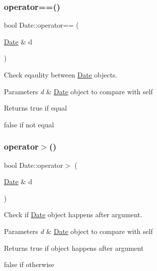 \subsubsection{\texorpdfstring{operator==()}{operator==()}}
{\footnotesize\ttfamily bool Date\+::operator== (\begin{DoxyParamCaption}\item[{\mbox{\hyperlink{classDate}{Date}} \&}]{d }\end{DoxyParamCaption})}



Check eqaulity between \mbox{\hyperlink{classDate}{Date}} objects. 


\begin{DoxyParams}{Parameters}
{\em d} & \mbox{\hyperlink{classDate}{Date}} object to compare with self \\
\hline
\end{DoxyParams}
\begin{DoxyReturn}{Returns}
true if equal 

false if not equal 
\end{DoxyReturn}
\mbox{\label{classDate_a0c2a1a6f890da1f9a360fab87e7109a3}} 
\subsubsection{\texorpdfstring{operator$>$()}{operator>()}}
{\footnotesize\ttfamily bool Date\+::operator$>$ (\begin{DoxyParamCaption}\item[{\mbox{\hyperlink{classDate}{Date}} \&}]{d }\end{DoxyParamCaption})}



Check if \mbox{\hyperlink{classDate}{Date}} object happens after argument. 


\begin{DoxyParams}{Parameters}
{\em d} & \mbox{\hyperlink{classDate}{Date}} object to compare with self \\
\hline
\end{DoxyParams}
\begin{DoxyReturn}{Returns}
true if object happens after argument 

false if otherwise 
\end{DoxyReturn}
\mbox{\label{classDate_a3dd4c3c4818d69669927bec072ff85ce}} 
